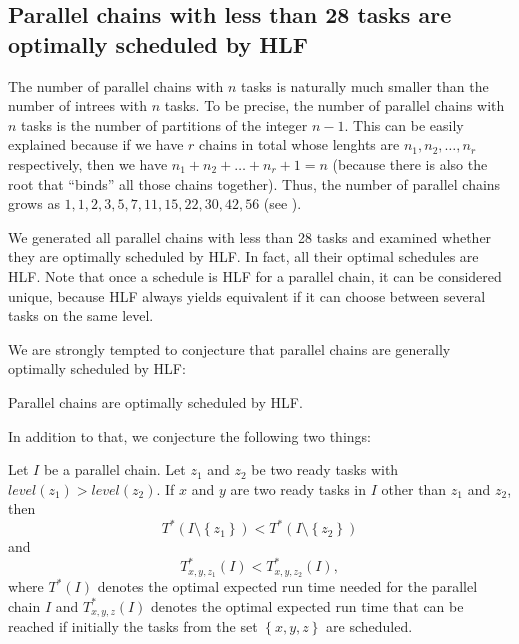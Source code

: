 \subsection{Parallel chains with less than 28 tasks are optimally scheduled by HLF}
\label{sec:parallel-chains-optimally-hlf}

\newcommand{\chainlengths}[1]{(#1)}

The number of parallel chains with $n$ tasks is naturally much smaller than the number of intrees with $n$ tasks. To be precise, the number of parallel chains with $n$ tasks is the number of partitions of the integer $n-1$. This can be easily explained because if we have $r$ chains in total whose lenghts are $n_1,n_2,\dots,n_r$ respectively, then we have $n_1+n_2+\dots+n_r+1 = n$ (because there is also the root that ``binds'' all those chains together). Thus, the number of parallel chains grows as $1, 1, 2, 3, 5, 7, 11, 15, 22, 30, 42, 56$ (see \cite{oeisnumberofpartitions}).

We generated all parallel chains with less than 28 tasks and examined whether they are optimally scheduled by HLF. In fact, all their optimal schedules are HLF. Note that once a schedule is HLF for a parallel chain, it can be considered unique, because HLF always yields equivalent if it can choose between several tasks on the same level.

We are strongly tempted to conjecture that parallel chains are generally optimally scheduled by HLF:

\begin{conjecture}
  \label{conj:parallel-chains-hlf-conjecture}
  Parallel chains are optimally scheduled by HLF.
\end{conjecture}

In addition to that, we conjecture the following two things:

\begin{conjecture}
  \label{conj:parallel-chains-complex-conjecture}
  Let $I$ be a parallel chain. Let $z_1$ and $z_2$ be two ready tasks with $level(z_1) > level(z_2)$. If $x$ and $y$ are two ready tasks in $I$ other than $z_1$ and $z_2$, then
  \begin{equation*}
    T^*(I\setminus\left\{ z_1 \right\}) < T^*(I\setminus\left\{ z_2 \right\})
  \end{equation*}
  and 
  \begin{equation*}
    T^*_{x,y,z_1}(I) < T^*_{x,y,z_2}(I),
  \end{equation*}
  where $T^*(I)$ denotes the optimal expected run time needed for the parallel chain $I$ and $T_{x,y,z}^*(I)$ denotes the optimal expected run time that can be reached if initially the tasks from the set $\left\{ x,y,z \right\}$ are scheduled.
\end{conjecture}

